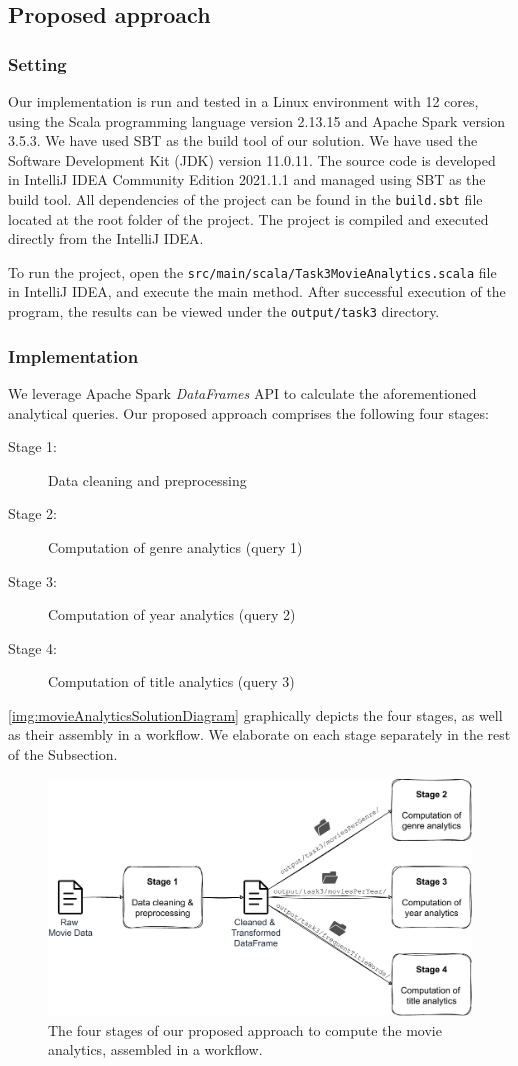 \documentclass[acmlarge]{acmart}
\begin{document}
  \subsection{Proposed approach}
  \subsubsection{Setting}
  Our implementation is run and tested in a Linux environment with 12 cores, using the Scala programming language version 2.13.15 and Apache Spark version 3.5.3. We have used SBT as the build tool of our solution.
  We have used the Software Development Kit (JDK) version 11.0.11.
  The source code is developed in IntelliJ IDEA Community Edition 2021.1.1 and managed using SBT as the build tool. All dependencies of the project can be found in the \texttt{build.sbt} file located at the root folder of the project.
  The project is compiled and executed directly from the IntelliJ IDEA.

  To run the project, open the \texttt{src/main/scala/Task3MovieAnalytics.scala} file in IntelliJ IDEA, and execute the main method. After successful execution of the program, the results can be viewed under the \texttt{output/task3} directory.

  \subsubsection{Implementation} We leverage Apache Spark \emph{DataFrames} API to calculate the aforementioned analytical queries. Our proposed approach comprises the following four stages:
  \begin{description}
    \item[Stage 1:] Data cleaning and preprocessing
    \item[Stage 2:] Computation of genre analytics (query 1)
    \item[Stage 3:] Computation of year analytics (query 2)
    \item[Stage 4:] Computation of title analytics (query 3)
  \end{description}
  \autoref{img:movieAnalyticsSolutionDiagram} graphically depicts the four stages, as well as their assembly in a workflow. We elaborate on each stage separately in the rest of the Subsection.

  \begin{figure}[tb!]
    \centering
    \includegraphics[width=0.7\linewidth]{figures/movieAnalytics}
    \caption{The four stages of our proposed approach to compute the movie analytics, assembled in a workflow.}
    \label{img:movieAnalyticsSolutionDiagram}
  \end{figure}
\end{document}
